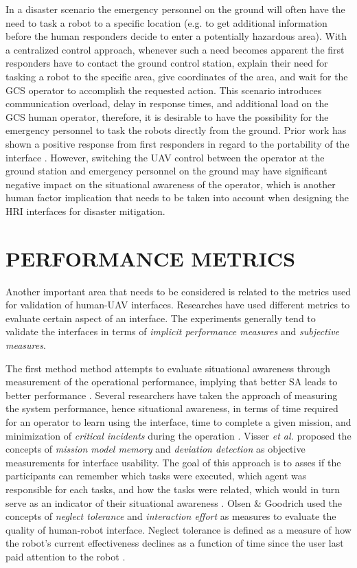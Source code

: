 \documentclass[12pt, letterpaper, oneside]{article}
\begin{document}
In a disaster scenario the emergency personnel on the ground will often have the need to task a robot to a specific location (e.g. to get additional information before the human responders decide to enter a potentially hazardous area). With a centralized control approach, whenever such a need becomes apparent the first responders have to contact the ground control station, explain their need for tasking a robot to the specific area, give coordinates of the area, and wait for the GCS operator to accomplish the requested action. This scenario introduces communication overload, delay in response times, and additional load on the GCS human operator, therefore, it is desirable to have the possibility for the emergency personnel to task the robots directly from the ground. Prior work has shown a positive response from first responders in regard to the portability of the interface \cite{25}. However, switching the UAV control between the operator at the ground station and emergency personnel on the ground may have significant negative impact on the situational awareness of the operator, which is another human factor implication that needs to be taken into account when designing the HRI interfaces for disaster mitigation. 

\section{PERFORMANCE METRICS}
Another important area that needs to be considered is related to the metrics used for validation of human-UAV interfaces. Researches have used different metrics to evaluate certain aspect of an interface. The experiments generally tend to validate the interfaces in terms of \emph{implicit performance measures} and \emph{subjective measures}.

The first method method attempts to evaluate situational awareness through measurement of the operational performance, implying that better SA leads to better performance \cite{12}. Several researchers have taken the approach of measuring the system performance, hence situational awareness, in terms of time required for an operator to learn using the interface, time to complete a given mission, and minimization of \emph{critical incidents} during the operation \cite{18}. Visser \emph{et al.} proposed the concepts of \emph{mission model memory} and \emph{deviation detection} as objective measurements for interface usability. The goal of this approach is to asses if the participants can remember which tasks were executed, which agent was responsible for each tasks, and how the tasks were related, which would in turn serve as an indicator of their situational awareness \cite{6}. Olsen \& Goodrich used the concepts of \emph{neglect tolerance} and \emph{interaction effort} as measures to evaluate the quality of human-robot interface. Neglect tolerance is defined as a measure of how the robot's current effectiveness declines as a function of time since the user last paid attention to the robot \cite{5}.
\end{document}
